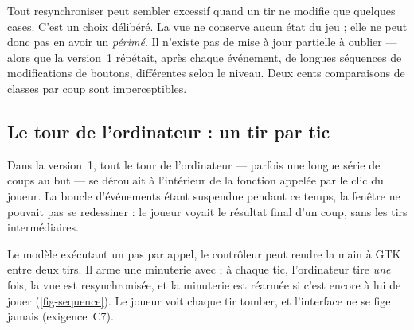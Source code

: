 Tout resynchroniser peut sembler excessif quand un tir ne modifie que quelques cases. C'est
un choix délibéré. La vue ne conserve aucun état du jeu ; elle ne peut donc pas en avoir un
\emph{périmé}. Il n'existe pas de mise à jour partielle à oublier --- alors que la
version~1 répétait, après chaque événement, de longues séquences de modifications de
boutons, différentes selon le niveau. Deux cents comparaisons de classes par coup sont
imperceptibles.

\subsection{Le tour de l'ordinateur : un tir par tic}

\begin{attention}
    Dans la version~1, tout le tour de l'ordinateur --- parfois une longue série de coups au
    but --- se déroulait à l'intérieur de la fonction appelée par le clic du joueur. La boucle
    d'événements étant suspendue pendant ce temps, la fenêtre ne pouvait pas se redessiner : le
    joueur voyait le résultat final d'un coup, sans les tirs intermédiaires.
\end{attention}

Le modèle exécutant un pas par appel, le contrôleur peut rendre la main à GTK entre deux
tirs. Il arme une minuterie avec  ; à chaque tic, l'ordinateur tire
\emph{une} fois, la vue est resynchronisée, et la minuterie est réarmée si c'est encore à
lui de jouer (\cref{fig-sequence}). Le joueur voit chaque tir tomber, et l'interface ne se
fige jamais (exigence~C7).

